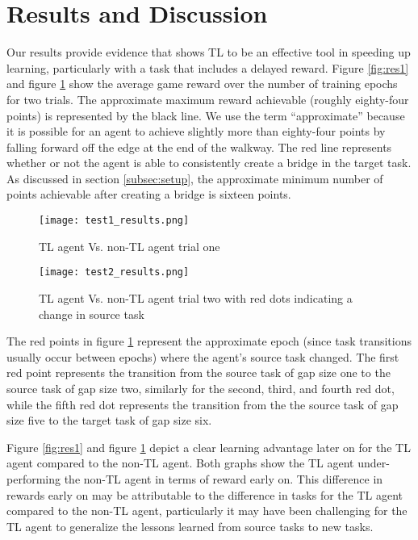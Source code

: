 \documentclass{llncs}
\begin{document}
\section{Results and Discussion}\label{sec:results}

Our results provide evidence that shows TL to be an effective tool in speeding up learning, particularly with a task that includes a delayed reward.
Figure \ref{fig:res1} and figure \ref{fig:res2} show the average game reward over the number of training epochs for two trials. 
The approximate maximum reward achievable (roughly eighty-four points) is represented by the black line.
We use the term ``approximate'' because it is possible for an agent to achieve slightly more than eighty-four points by falling forward off the edge at the end of the walkway.
The red line represents whether or not the agent is able to consistently create a bridge in the target task. 
As discussed in section \ref{subsec:setup}, the approximate minimum number of points achievable after creating a bridge is sixteen points.


\begin{figure}[H]
  \begin{center}
    \texttt{[image: test1\_results.png]}
  \end{center}
  \caption{TL agent Vs. non-TL agent trial one}
  \label{fig:res1}

  \begin{center}
    \texttt{[image: test2\_results.png]}
  \end{center}
  \caption{TL agent Vs. non-TL agent trial two with red dots indicating a change in source task}
  \label{fig:res2}
\end{figure}

The red points in figure \ref{fig:res2} represent the approximate epoch (since task transitions usually occur between epochs) where the agent's source task changed.  
The first red point represents the transition from the source task of gap size one to the source task of gap size two, similarly for the second, third, and fourth red dot, while the fifth red dot represents the transition from the the source task of gap size five to the target task of gap size six. 


Figure \ref{fig:res1} and figure \ref{fig:res2} depict a clear learning advantage later on for the TL agent compared to the non-TL agent. 
Both graphs show the TL agent under-performing the non-TL agent in terms of reward early on.
This difference in rewards early on may be attributable to the difference in tasks for the TL agent compared to the non-TL agent, particularly it may have been challenging for the TL agent to generalize the lessons learned from source tasks to new tasks.
\end{document}
